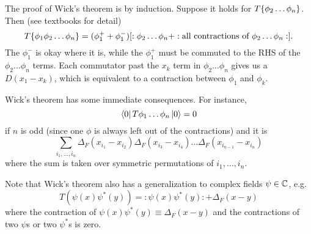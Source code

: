 The proof of Wick's theorem is by induction. Suppose it holds for $T\{\phi_2\ldots \phi_n\}$. Then (see textbooks for detail)
$$T\{\phi_1 \phi_2\ldots \phi_n\}=(\phi_1^+ +\phi_1^-)[:\phi_2\ldots \phi_n+:\text{all contractions of }\phi_2\ldots \phi_n:].$$
The $\phi_1^-$ is okay where it is, while the $\phi_1^+$ must be commuted to the RHS of the $\phi_2\ldots \phi_n$ terms. Each commutator past the $x_k$ term in $\phi_2\ldots \phi_n$ gives us a $D(x_1-x_k)$, which is equivalent to a contraction between $\phi_1$ and $\phi_k$.

Wick's theorem has some immediate consequences. For instance,
$$\left< 0 \right|T \phi_1\ldots \phi_n\left| 0 \right>=0$$ if $n$ is odd (since one $\phi$ is always left out of the contractions) and it is
$$\sum_{i_1,\ldots,i_n}\Delta_F (x_{i_1}-x_{i_2})\Delta_F(x_{i_3}-x_{i_4})\ldots \Delta_F(x_{i_{n-1}}-x_{i_n})$$
where the sum is taken over symmetric permutations of $i_1,\ldots,i_n$.

Note that Wick's theorem also has a generalization to complex fields $\psi\in \mathbb{C}$, e.g.
$$T(\psi(x)\psi^*(y))=:\psi(x)\psi^*(y):+\Delta_F(x-y)$$
where the contraction of $\psi(x)\psi^*(y)\equiv \Delta_F(x-y)$ and the contractions of two $\psi$s or two $\psi^*$s is zero.